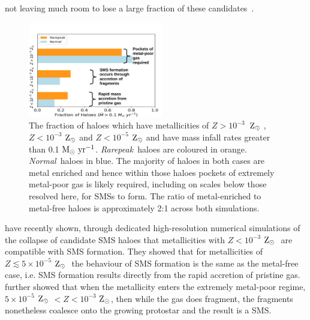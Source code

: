 \documentclass[graphics, twocolumn, usenatbib]{mn2e}
\newcommand{\msolaryrc} {$\rm{M_{\odot}~yr^{-1}}$}
\newcommand{\zsolar} {$\rm{Z_{\odot}}~$}
\newcommand{\zsolarc} {$\rm{Z_{\odot}}$}
\newcommand{\rarepeak} {\textit{Rarepeak~}}
\newcommand{\normal} {\textit{Normal~}}
\begin{document}
not leaving much room to lose a large fraction of these candidates~\citep{Agarwal_2012, Visbal_2014b, Agarwal_2015b, Latif_2014a,
  Valiante_2016, Habouzit_2016, Valiante_2017, Habouzit_2017, Regan_2017}. \\
\begin{figure}
   \centering 
\includegraphics[width=0.525\textwidth]{FIGURES/FinalPlot-crop.pdf}
\caption{The fraction of haloes which have metallicities of $Z > 10^{-3}$~\zsolar,
  $Z < 10^{-3}$ \zsolar and $ Z < 10^{-5}$ \zsolar and have mass infall rates greater than
  0.1 \msolaryrc. \rarepeak haloes are coloured in orange. \normal haloes in blue. 
  The majority of haloes in both cases are metal enriched and hence within
  those haloes pockets of extremely metal-poor gas 
  is likely required, including on scales below those resolved here, for SMSs to form. The
  ratio of metal-enriched to metal-free haloes is approximately 2:1 across both simulations.} \label{Fig:Fractions}
\end{figure}
\indent \cite{Chon_2020} have recently shown, through dedicated high-resolution numerical simulations
of the collapse of candidate SMS haloes that metallicities with $Z < 10^{-3}$ \zsolar
are compatible with SMS formation. They showed that for metallicities of $Z \lesssim 5 \times 10^{-5}$ \zsolar
the behaviour of SMS formation is the same as the metal-free case, i.e. SMS formation results
directly from the rapid accretion of pristine gas. 
\cite{Chon_2020} further showed that when the metallicity enters the
extremely metal-poor regime, $5 \times 10^{-5}$ \zsolar $ < Z < 10^{-3}$ \zsolarc, then while
the gas does fragment, the fragments nonetheless coalesce onto the growing protostar and the
result is a SMS. 
\end{document}
